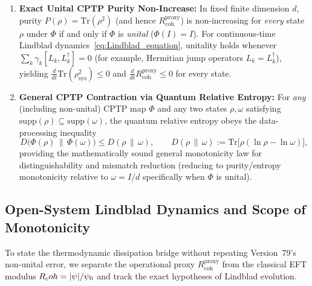 \begin{result}
\begin{enumerate}[leftmargin=2em]
\begin{itemize}
  \end{itemize}
  \item \textbf{Exact Unital CPTP Purity Non-Increase:} In fixed finite dimension $d$, purity $P(\rho) = \mathrm{Tr}(\rho^2)$ (and hence $R_{\mathrm{coh}}^{\mathrm{proxy}}$) is non-increasing for \emph{every} state $\rho$ under $\Phi$ if and only if $\Phi$ is \emph{unital} ($\Phi(I) = I$). For continuous-time Lindblad dynamics~\eqref{eq:Lindblad_equation}, unitality holds whenever $\sum_k \gamma_k [L_k, L_k^\dagger] = 0$ (for example, Hermitian jump operators $L_k = L_k^\dagger$), yielding $\frac{d}{dt}\mathrm{Tr}(\rho_{\mathrm{sys}}^2) \le 0$ and $\frac{d}{dt}R_{\mathrm{coh}}^{\mathrm{proxy}} \le 0$ for every state.
  \item \textbf{General CPTP Contraction via Quantum Relative Entropy:} For \emph{any} (including non-unital) CPTP map $\Phi$ and any two states $\rho, \omega$ satisfying $\mathrm{supp}(\rho) \subseteq \mathrm{supp}(\omega)$, the quantum relative entropy obeys the data-processing inequality
  \begin{equation}
  D\bigl(\Phi(\rho)\,\|\,\Phi(\omega)\bigr) \le D(\rho\,\|\,\omega),
  \qquad
  D(\rho\,\|\,\omega) := \mathrm{Tr}\bigl[\rho(\ln\rho - \ln\omega)\bigr],
  \label{eq:relative_entropy_dpi}
  \end{equation}
  providing the mathematically sound general monotonicity law for distinguishability and mismatch reduction (reducing to purity/entropy monotonicity relative to $\omega = I/d$ specifically when $\Phi$ is unital).
\end{enumerate}
\end{result}

\subsection{Open-System Lindblad Dynamics and Scope of Monotonicity}
\label{sec:CoherenceConservationArrow}
To state the thermodynamic dissipation bridge without repeating Version~79's non-unital error, we separate the operational proxy $R_{\mathrm{coh}}^{\mathrm{proxy}}$ from the classical EFT modulus $R_coh = |\psi|/\psi_0$ and track the exact hypotheses of Lindblad evolution.

